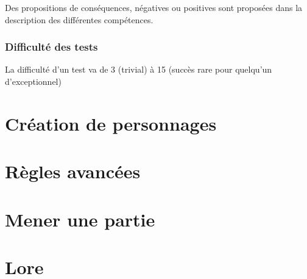 \documentclass[10pt,a4paper]{book}
\begin{document}
Des propositions de conséquences, négatives ou positives sont proposées dans la description des différentes compétences.
\subsection{Difficulté des tests}
La difficulté d'un test va de 3 (trivial) à 15 (succès rare pour quelqu'un d'exceptionnel)
\chapter{Création de personnages}
\chapter{Règles avancées}
\chapter{Mener une partie}
\chapter{Lore}
\end{document}
